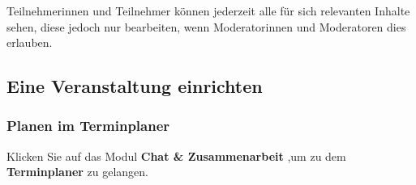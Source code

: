 \documentclass[
  letterpaper,
  DIV=11,
  numbers=noendperiod]{scrreprt}
\begin{document}
Teilnehmerinnen und Teilnehmer können jederzeit alle für sich relevanten
Inhalte sehen, diese jedoch nur bearbeiten, wenn Moderatorinnen und
Moderatoren dies erlauben.

\subsection{Eine Veranstaltung
einrichten}\label{eine-veranstaltung-einrichten}

\subsubsection{Planen im Terminplaner}\label{planen-im-terminplaner}

Klicken Sie auf das Modul \textbf{Chat \& Zusammenarbeit} ,um zu dem
\textbf{Terminplaner} zu gelangen.
\end{document}
